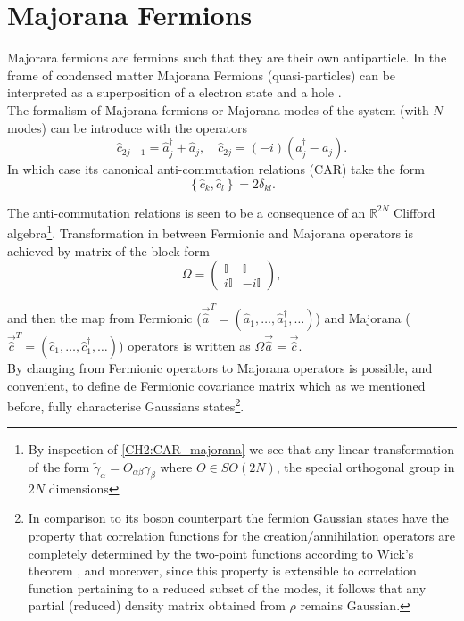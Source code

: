 \section{Majorana Fermions}
Majorara fermions are fermions such that they are their own antiparticle. In the frame of condensed matter Majorana Fermions (quasi-particles) can be interpreted as a superposition of a electron state and a hole \cite{leijnse_introduction_2012}.
\\
The formalism of Majorana fermions or Majorana modes of the system (with $N$ modes) can be introduce with the operators
\begin{equation}
\hat{c}_{2j-1}=\hat{a}_{j}^{\dagger}+\hat{a}_{j}, \quad \hat{c}_{2j}=(-i)\left(a_{j}^{\dagger}-a_{j}\right).
\label{CH2:majorana}
\end{equation}
In which case its canonical anti-commutation relations (CAR) take the form
\begin{equation}
\left\{\hat{c}_{k},\hat{c}_{l}\right\}=2 \delta_{k l}.
\label{CH2:CAR_majorana}
\end{equation}

The anti-commutation relations is seen to be a consequence of an $\mathbb{R}^{2N}$ Clifford algebra\footnote{By inspection of \eqref{CH2:CAR_majorana} we see that  any linear transformation of the form $\tilde{\gamma}_{\alpha} = O_{\alpha\beta}\gamma_{\beta}$ where $O\in SO(2N)$, the special orthogonal group in $2N$  dimensions}. Transformation in between Fermionic and Majorana operators is achieved by matrix of the block form
\begin{equation}
\Omega=\left(\begin{array}{cc}
\mathbb{I} & \mathbb{I} \\
i \mathbb{I} & -i \mathbb{I}
\end{array}\right),
\end{equation}

and then the map from Fermionic ($\vec{\hat{a}}^{T} = (\hat{a}_1,\ldots,\hat{a}_1^{\dagger},\ldots)$) and Majorana ($\vec{\hat{c}}^{T} = (\hat{c}_1,\ldots,\hat{c}_1^{\dagger},\ldots)$) operators is written as $\Omega\vec{\hat{a}}=\vec{\hat{c}}$.
\\
By changing from Fermionic operators to Majorana operators is possible, and convenient, to define de Fermionic covariance matrix which as we mentioned before, fully characterise Gaussians states\footnote{In comparison to its boson counterpart the fermion Gaussian states have the property that correlation functions for the creation/annihilation operators are completely determined by the two-point functions according to Wick’s theorem \cite{westwanski_general_1973}, and moreover,  since this property is extensible to correlation function pertaining to a reduced subset of the modes, it follows that any partial (reduced) density matrix obtained from $\rho$ remains Gaussian.}.
